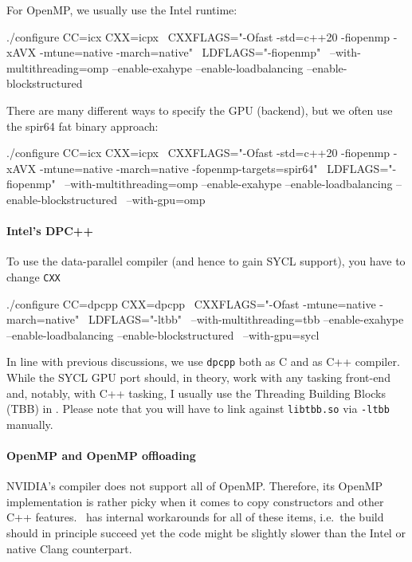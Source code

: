 For OpenMP, we usually use the Intel runtime:

\begin{bash}
./configure CC=icx CXX=icpx \
 CXXFLAGS="-Ofast -std=c++20 -fiopenmp -xAVX -mtune=native -march=native" \
 LDFLAGS="-fiopenmp" \
 --with-multithreading=omp --enable-exahype --enable-loadbalancing --enable-blockstructured
\end{bash}

\noindent
There are many different ways to specify the GPU (backend), but we often use the
spir64 fat binary approach:


\begin{bash}
./configure CC=icx CXX=icpx \
 CXXFLAGS="-Ofast -std=c++20 -fiopenmp -xAVX -mtune=native -march=native -fopenmp-targets=spir64" \
 LDFLAGS="-fiopenmp" \
 --with-multithreading=omp --enable-exahype --enable-loadbalancing --enable-blockstructured \
 --with-gpu=omp
\end{bash}



\paragraph{Intel's DPC++}
%
To use the data-parallel compiler (and hence to gain SYCL support), you have to
change \texttt{CXX}

\begin{bash}
./configure CC=dpcpp CXX=dpcpp \
 CXXFLAGS="-Ofast -mtune=native -march=native" \
 LDFLAGS="-ltbb" \
 --with-multithreading=tbb --enable-exahype --enable-loadbalancing --enable-blockstructured \ 
 --with-gpu=sycl
\end{bash}

\noindent
In line with previous discussions, we use \texttt{dpcpp} both as C and as C++
compiler. 
While the SYCL GPU port should, in theory, work with any tasking front-end and,
notably, with C++ tasking, I usually use the Threading Building Blocks (TBB) in
\Peano.
Please note that you will have to link against \texttt{libtbb.so} via
\texttt{-ltbb} manually.








\paragraph{OpenMP and OpenMP offloading}

NVIDIA's compiler does not support all of OpenMP. Therefore, its OpenMP
implementation is rather picky when it comes to copy constructors and other C++
features. \Peano\ has internal workarounds for all of these items, i.e.~the
build should in principle succeed yet the code might be slightly slower than the
Intel or native Clang counterpart.

